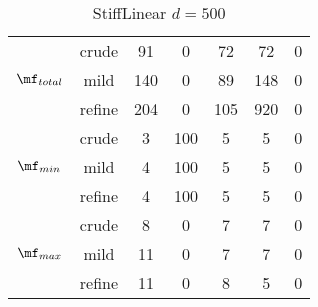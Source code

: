 \begin{table}[htb]
\begin{tabular}{ |c|c|c|c|c|c|c| }
\hline
  & crude & 91 & 0 & 72 & 72 & 0 \\
 $\mf_{total}$  & mild & 140 & 0 & 89 & 148 & 0 \\
  & refine & 204 & 0 & 105 & 920 & 0 \\
\hline
  & crude & 3 & 100 & 5 & 5 & 0 \\
 $\mf_{min}$  & mild & 4 & 100 & 5 & 5 & 0 \\
  & refine & 4 & 100 & 5 & 5 & 0 \\
\hline
  & crude & 8 & 0 & 7 & 7 & 0 \\
 $\mf_{max}$  & mild & 11 & 0 & 7 & 7 & 0 \\
  & refine & 11 & 0 & 8 & 5 & 0 \\
\hline
\end{tabular}
\caption{ StiffLinear $d=500$ }
\end{table}
